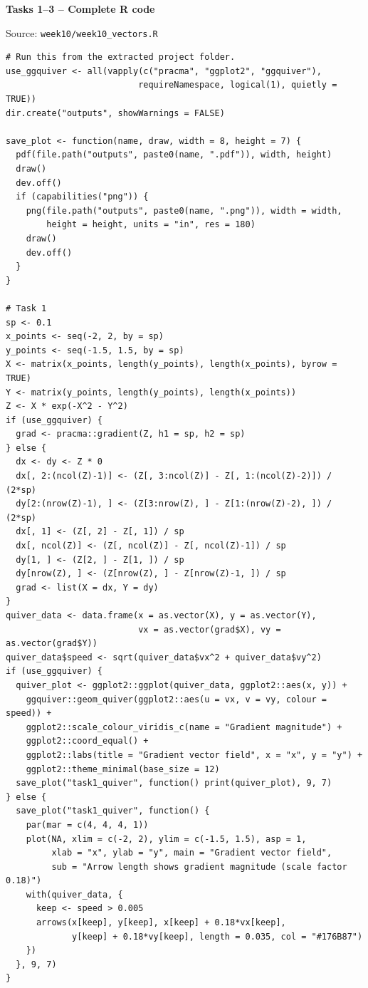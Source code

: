 \documentclass{article}
\begin{document}
{\large\bfseries\color{blue} Tasks 1--3 -- Complete R code}\par{\small Source: \texttt{week10/week10\_vectors.R}}\par
\begin{verbatim}
# Run this from the extracted project folder.
use_ggquiver <- all(vapply(c("pracma", "ggplot2", "ggquiver"),
                          requireNamespace, logical(1), quietly = TRUE))
dir.create("outputs", showWarnings = FALSE)

save_plot <- function(name, draw, width = 8, height = 7) {
  pdf(file.path("outputs", paste0(name, ".pdf")), width, height)
  draw()
  dev.off()
  if (capabilities("png")) {
    png(file.path("outputs", paste0(name, ".png")), width = width,
        height = height, units = "in", res = 180)
    draw()
    dev.off()
  }
}

# Task 1
sp <- 0.1
x_points <- seq(-2, 2, by = sp)
y_points <- seq(-1.5, 1.5, by = sp)
X <- matrix(x_points, length(y_points), length(x_points), byrow = TRUE)
Y <- matrix(y_points, length(y_points), length(x_points))
Z <- X * exp(-X^2 - Y^2)
if (use_ggquiver) {
  grad <- pracma::gradient(Z, h1 = sp, h2 = sp)
} else {
  dx <- dy <- Z * 0
  dx[, 2:(ncol(Z)-1)] <- (Z[, 3:ncol(Z)] - Z[, 1:(ncol(Z)-2)]) / (2*sp)
  dy[2:(nrow(Z)-1), ] <- (Z[3:nrow(Z), ] - Z[1:(nrow(Z)-2), ]) / (2*sp)
  dx[, 1] <- (Z[, 2] - Z[, 1]) / sp
  dx[, ncol(Z)] <- (Z[, ncol(Z)] - Z[, ncol(Z)-1]) / sp
  dy[1, ] <- (Z[2, ] - Z[1, ]) / sp
  dy[nrow(Z), ] <- (Z[nrow(Z), ] - Z[nrow(Z)-1, ]) / sp
  grad <- list(X = dx, Y = dy)
}
quiver_data <- data.frame(x = as.vector(X), y = as.vector(Y),
                          vx = as.vector(grad$X), vy = as.vector(grad$Y))
quiver_data$speed <- sqrt(quiver_data$vx^2 + quiver_data$vy^2)
if (use_ggquiver) {
  quiver_plot <- ggplot2::ggplot(quiver_data, ggplot2::aes(x, y)) +
    ggquiver::geom_quiver(ggplot2::aes(u = vx, v = vy, colour = speed)) +
    ggplot2::scale_colour_viridis_c(name = "Gradient magnitude") +
    ggplot2::coord_equal() +
    ggplot2::labs(title = "Gradient vector field", x = "x", y = "y") +
    ggplot2::theme_minimal(base_size = 12)
  save_plot("task1_quiver", function() print(quiver_plot), 9, 7)
} else {
  save_plot("task1_quiver", function() {
    par(mar = c(4, 4, 4, 1))
    plot(NA, xlim = c(-2, 2), ylim = c(-1.5, 1.5), asp = 1,
         xlab = "x", ylab = "y", main = "Gradient vector field",
         sub = "Arrow length shows gradient magnitude (scale factor 0.18)")
    with(quiver_data, {
      keep <- speed > 0.005
      arrows(x[keep], y[keep], x[keep] + 0.18*vx[keep],
             y[keep] + 0.18*vy[keep], length = 0.035, col = "#176B87")
    })
  }, 9, 7)
}


\end{verbatim}
\end{document}

